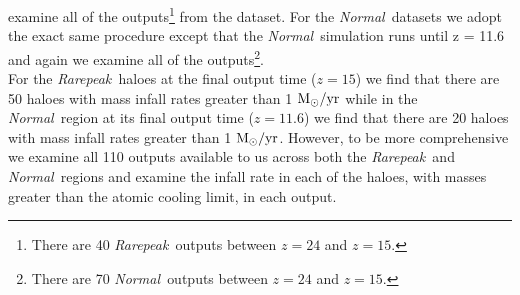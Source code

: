 \documentclass[graphics, twocolumn, usenatbib]{mn2e}
\newcommand{\msolaryr} {$\rm{M_{\odot}/yr}~$}
\newcommand{\msolaryrc} {$\rm{M_{\odot}/yr}$}
\newcommand{\rarepeak} {\textit{Rarepeak~}}
\newcommand{\normal} {\textit{Normal~}}
\begin{document}
examine all of the outputs\footnote{There are 40 \rarepeak outputs between $z = 24$ and $z = 15$.}
from the dataset. For the \normal datasets we adopt the exact same procedure except that
the \normal simulation runs until z = 11.6 and again we examine all of the
outputs\footnote{There are 70 \normal outputs between $z = 24$ and $z = 15$.}.\\
\indent For the \rarepeak haloes at the final output time ($z = 15$) we find that there are
50 haloes with mass infall rates greater than 1 \msolaryr while in the \normal region at its final
output time ($z = 11.6$) we find that there are 20 haloes with mass infall rates
greater than 1 \msolaryrc. However, to be more comprehensive we examine all 110 outputs available to
us across both the \rarepeak and \normal regions and examine the infall rate in each of the haloes,
with masses greater than the atomic cooling limit, in each output. \\
\end{document}
